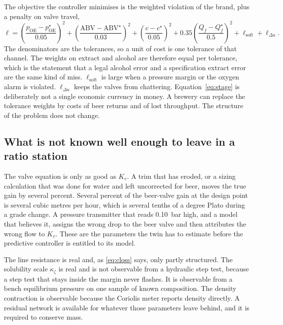 The objective the controller minimises is the weighted violation of the brand, plus a penalty on valve travel,
\begin{equation}
\label{eq:stage}
\ell
=
\left(\frac{p_{\mathrm{OE}}-p_{\mathrm{OE}}^{\star}}{0.05}\right)^{2}
+
\left(\frac{\mathrm{ABV}-\mathrm{ABV}^{\star}}{0.03}\right)^{2}
+
\left(\frac{c-c^{\star}}{0.05}\right)^{2}
+
0.35\left(\frac{Q_f-Q_f^{\star}}{0.5}\right)^{2}
+
\ell_{\mathrm{soft}}
+
\ell_{\Delta u}.
\end{equation}
The denominators are the tolerances, so a unit of cost is one tolerance of that channel. The weights on extract and alcohol are therefore equal per tolerance, which is the statement that a legal alcohol error and a specification extract error are the same kind of miss. $\ell_{\mathrm{soft}}$ is large when a pressure margin or the oxygen alarm is violated. $\ell_{\Delta u}$ keeps the valves from chattering. Equation~\eqref{eq:stage} is deliberately not a single economic currency in money. A brewery can replace the tolerance weights by costs of beer returns and of lost throughput. The structure of the problem does not change.

\subsection{What is not known well enough to leave in a ratio station}

The valve equation is only as good as $K_v$. A trim that has eroded, or a sizing calculation that was done for water and left uncorrected for beer, moves the true gain by several percent. Several percent of the beer-valve gain at the design point is several cubic metres per hour, which is several tenths of a degree Plato during a grade change. A pressure transmitter that reads \SI{0.10}{bar} high, and a model that believes it, assigns the wrong drop to the beer valve and then attributes the wrong flow to $K_v$. These are the parameters the twin has to estimate before the predictive controller is entitled to its model.

The line resistance is real and, as \eqref{eq:closs} says, only partly structured. The solubility scale $\kappa_{\zeta}$ is real and is not observable from a hydraulic step test, because a step test that stays inside the margin never flashes. It is observable from a bench equilibrium pressure on one sample of known composition. The density contraction is observable because the Coriolis meter reports density directly. A residual network is available for whatever those parameters leave behind, and it is required to conserve mass.

